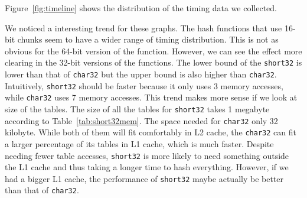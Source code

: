 \documentclass[11pt]{article}
\begin{document}
Figure~\ref{fig:timeline} shows the distribution of the timing data we collected.

We noticed a interesting trend for these graphs.
The hash functions that use 16-bit chunks seem to have a wider range 
of timing distribution. This is not as obvious  for the 64-bit version of the function.
However, we can see the effect more clearing in the 32-bit versions of the functions.
The lower bound of the \texttt{short32} is lower than that of \texttt{char32} 
but the upper bound is also higher than \texttt{char32}. Intuitively,  \texttt{short32}
should be faster because it only uses 3 memory accesses, 
while \texttt{char32} uses 7 memory accesses. This trend makes 
more sense if we look at size of the tables. The size of all the tables for \texttt{short32}
takes 1 megabyte according to Table~\ref{tab:short32mem}. The space needed 
for \texttt{char32} only 32 kilobyte. While both of them will fit comfortably in L2 cache,
the \texttt{char32} can fit a larger percentage of its tables in L1 cache, which is much faster.
Despite needing fewer table accesses, \texttt{short32} is more likely to need 
something outside the L1 cache and thus taking a longer time to hash everything.
However, if we had a bigger L1 cache, the performance of \texttt{short32} maybe actually
be better than that of \texttt{char32}.
\end{document}
